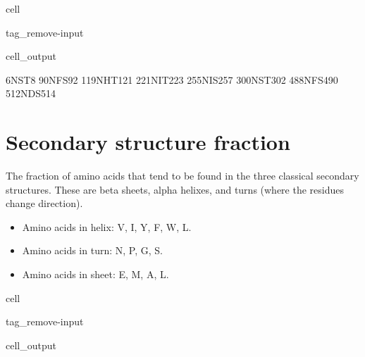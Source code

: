 \documentclass[letterpaper,10pt,english]{jupyterBook}
\begin{document}
\begin{sphinxuseclass}{cell}
\begin{sphinxuseclass}{tag_remove-input}\begin{sphinxVerbatimOutput}

\begin{sphinxuseclass}{cell_output}
\begin{sphinxVerbatim}[commandchars=\\\{\}]
6\PYGZhy{}NST\PYGZhy{}8
90\PYGZhy{}NFS\PYGZhy{}92
119\PYGZhy{}NHT\PYGZhy{}121
221\PYGZhy{}NIT\PYGZhy{}223
255\PYGZhy{}NIS\PYGZhy{}257
300\PYGZhy{}NST\PYGZhy{}302
488\PYGZhy{}NFS\PYGZhy{}490
512\PYGZhy{}NDS\PYGZhy{}514
\end{sphinxVerbatim}

\end{sphinxuseclass}\end{sphinxVerbatimOutput}

\end{sphinxuseclass}
\end{sphinxuseclass}

\section{Secondary structure fraction}
\label{\detokenize{ipynb/chapter1:secondary-structure-fraction}}
\sphinxAtStartPar
The fraction of amino acids that tend to be found in the three classical secondary structures. These are beta sheets, alpha helixes, and turns (where the residues change direction).
\begin{itemize}
\item {} 
\sphinxAtStartPar
Amino acids in helix: V, I, Y, F, W, L.

\item {} 
\sphinxAtStartPar
Amino acids in turn: N, P, G, S.

\item {} 
\sphinxAtStartPar
Amino acids in sheet: E, M, A, L.

\end{itemize}

\begin{sphinxuseclass}{cell}
\begin{sphinxuseclass}{tag_remove-input}\begin{sphinxVerbatimOutput}

\begin{sphinxuseclass}{cell_output}
\noindent{}

\end{sphinxuseclass}\end{sphinxVerbatimOutput}

\end{sphinxuseclass}
\end{sphinxuseclass}
\end{document}
